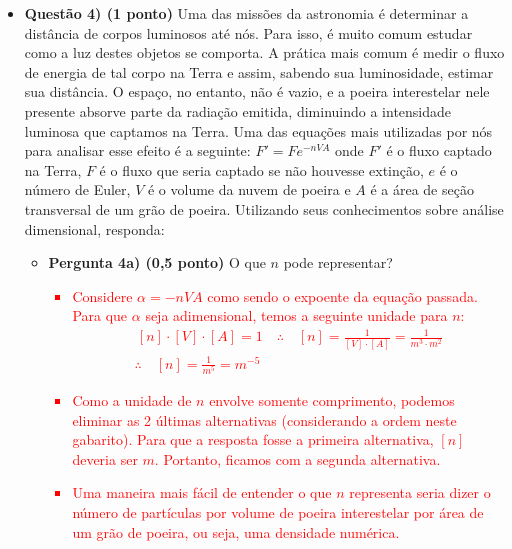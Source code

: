 \documentclass[a4paper, 12pt]{article}
\newcommand{\red}[1]{\textcolor{red}{#1}}
\begin{document}
\begin{flushleft}
\begin{itemize}
            \item \textbf{Questão 4) (1 ponto)} Uma das missões da astronomia é determinar a distância de corpos luminosos até nós. Para isso, é muito comum estudar como a luz destes objetos se comporta. A prática mais comum é medir o fluxo de energia de tal corpo na Terra e assim, sabendo sua luminosidade, estimar sua distância. O espaço, no entanto, não é vazio, e a poeira interestelar nele presente absorve parte da radiação emitida, diminuindo a intensidade luminosa que captamos na Terra. Uma das equações mais utilizadas por nós para analisar esse efeito é a seguinte: $F'=F e^{-nVA}$ onde $F'$ é o fluxo captado na Terra, $F$ é o fluxo que seria captado se não houvesse extinção, $e$ é o número de Euler, $V$ é o volume da nuvem de poeira e $A$ é a área de seção transversal de um grão de poeira. Utilizando seus conhecimentos sobre análise dimensional, responda:
                \begin{itemize}
                    \item \textbf{Pergunta 4a) (0,5 ponto)} O que $n$ pode representar?
                        \red{\begin{itemize}
                            \item Considere $\alpha=-nVA$ como sendo o expoente da equação passada. Para que $\alpha$ seja adimensional, temos a seguinte unidade para $n$:
                                \begin{equation*} \begin{gathered}
                                    \, [n] \cdot [V] \cdot [A] = 1 \quad \therefore \quad [n]=\frac{1}{[V] \cdot [A]}=\frac{1}{m^3 \cdot m^2} \\
                                    \therefore \quad [n] = \frac{1}{m^5} = m^{-5}
                                \end{gathered} \end{equation*}
                            \item Como a unidade de $n$ envolve somente comprimento, podemos eliminar as 2 últimas alternativas (considerando a ordem neste gabarito). Para que a resposta fosse a primeira alternativa, $[n]$ deveria ser $m$. Portanto, ficamos com a segunda alternativa.
                            \item Uma maneira mais fácil de entender o que $n$ representa seria dizer o número de partículas por volume de poeira interestelar por área de um grão de poeira, ou seja, uma densidade numérica.
                        \end{itemize}}

\end{itemize}
\end{itemize}
\end{flushleft}
\end{document}
